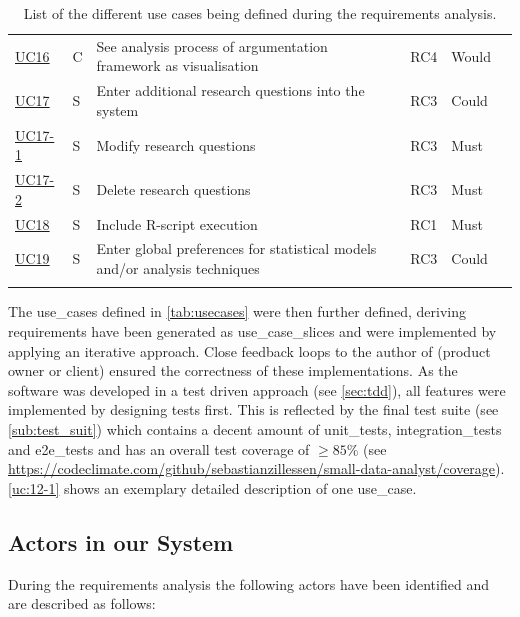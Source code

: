 \begin{landscape}
\begin{longtable}{ l l p{10.5cm} l l p{3cm} }
		\href{https://trello.com/c/3FCcFdmm}{UC16}  &   C & 	See analysis process of argumentation framework as visualisation & RC4 & Would	&    \\
		\href{https://trello.com/c/Hv2xe2UW}{UC17}  &   S & 	Enter additional research questions into the system & RC3 &Could& \\
		\href{https://trello.com/c/w1YiIgU7}{UC17-1}&   S & 	Modify research questions&RC3 & Must &  \\
		\href{https://trello.com/c/UbT5mtDx}{UC17-2}&   S & 	Delete research questions&RC3&Must& \\
		\href{https://trello.com/c/dpLHOxbB}{UC18}  &   S & 	Include R-script execution	 & RC1 & Must & \\
		\href{https://trello.com/c/bZHdWpkt}{UC19}  &   S & 	Enter global preferences for statistical models and/or analysis techniques& RC3 & Could &	 \\

		\caption{List of the different use cases being defined during the requirements analysis.}	
		\label{tab:usecases}
	\end{longtable}
\end{landscape}

The \glspl{use_case} defined in \autoref{tab:usecases} were then further defined, deriving requirements have been generated as \glspl{use_case_slice} and were implemented by applying an iterative approach. Close feedback loops to the author of \cite{sassoon2016,sassoon2014,sassoon2016CD} (\gls{product owner} or client) ensured the correctness of these implementations. As the software was developed in a test driven approach (see \autoref{sec:tdd}), all features were implemented by designing tests first. This is reflected by the final test suite (see \autoref{sub:test_suit}) which contains a decent amount of \glspl{unit_test}, \glspl{integration_test} and \glspl{e2e_test} and has an overall test coverage of $ \geq 85\%$ (see \href{https://codeclimate.com/github/sebastianzillessen/small-data-analyst/coverage}{https://codeclimate.com/github/sebastianzillessen/small-data-analyst/coverage}). \autoref{uc:12-1} shows an exemplary detailed description of one \gls{use_case}.





\subsection{Actors in our System}
\label{sub:sassoon:actors}
During the requirements analysis the following actors have been identified and are described as follows:

